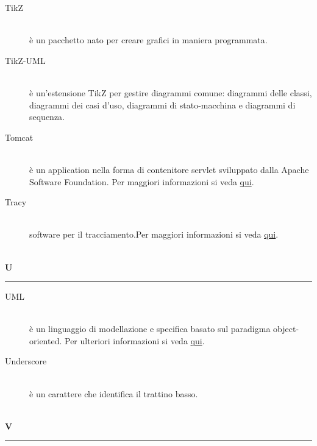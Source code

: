 \documentclass[12pt,a4paper]{article}
\begin{document}
\begin{description}
\item[TikZ] 
\hfill\\è un pacchetto  nato per creare grafici in maniera programmata.

\item[TikZ-UML] 
\hfill\\è un'estensione TikZ per gestire diagrammi  comune: diagrammi delle classi, diagrammi dei casi d'uso, diagrammi di stato-macchina e diagrammi di sequenza.

\item[Tomcat] 
\hfill\\è un application  nella forma di contenitore servlet  sviluppato dalla Apache Software Foundation. Per maggiori informazioni si veda \href{https://it.wikipedia.org/wiki/Apache_Tomcat}{qui}.

\item[Tracy] 
\hfill\\software {} per il tracciamento.Per maggiori informazioni si veda \href{http://tracy-tpiga.rhcloud.com/tracy/}{qui}.
\end{description}

\newpage

\begin{center}
\hfill\\
	\LARGE \textbf{U}
\hfill\\
\rule[15pt]{30pt}{0.5pt}
\end{center}

\begin{description}
\item[UML] 
\hfill\\è un linguaggio di modellazione e specifica basato sul paradigma object-oriented. Per ulteriori informazioni si veda \href{http://it.wikipedia.org/wiki/Unified_Modeling_Language}{qui}.

\item[Underscore] 
\hfill\\è un carattere che identifica il trattino basso.
\end{description}

\newpage

\begin{center}
\hfill\\
	\LARGE \textbf{V}
\hfill\\
\rule[15pt]{30pt}{0.5pt}
\end{center}
\end{document}
